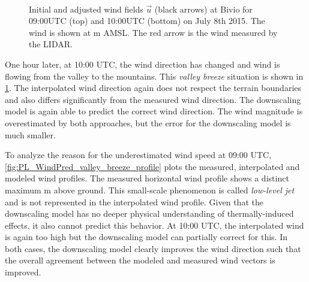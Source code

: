 \documentclass[twocolumn,letterpaper]{IEEEAerospaceCLS}
\begin{document}
\begin{figure}[htbp]
\centering
{}\\[0.7ex]%
\caption[Valley breeze Bivio]{Initial and adjusted wind fields $\vec{u}$ (black arrows) at Bivio for 09:00UTC (top) and 10:00UTC (bottom) on July 8th 2015. The wind is shown at \unit[1900]{m} AMSL. The red arrow is the wind measured by the LIDAR.}
\label{fig:PL_WindPred_valley_breeze}
\end{figure}

One hour later, at 10:00 UTC, the wind direction has changed and wind is flowing from the valley to the mountains. This \emph{valley breeze} situation is shown in \cref{fig:PL_WindPred_valley_breeze}. The interpolated wind direction again does not respect the terrain boundaries and also differs significantly from the measured wind direction. The downscaling model is again able to predict the correct wind direction. The wind magnitude is overestimated by both approaches, but the error for the downscaling model is much smaller.

To analyze the reason for the underestimated wind speed at 09:00 UTC, \cref{fig:PL_WindPred_valley_breeze_profile} plots the measured, interpolated and modeled wind profiles. The measured horizontal wind profile shows a distinct maximum \unit[40]{m} above ground. This small-scale phenomenon is called \emph{low-level jet} and is not represented in the interpolated wind profile. Given that the downscaling model has no deeper physical understanding of thermally-induced effects, it also cannot predict this behavior. At 10:00 UTC, the interpolated wind is again too high but the downscaling model can partially correct for this. In both cases, the downscaling model clearly improves the wind direction such that the overall agreement between the modeled and measured wind vectors is improved. 
\end{document}
